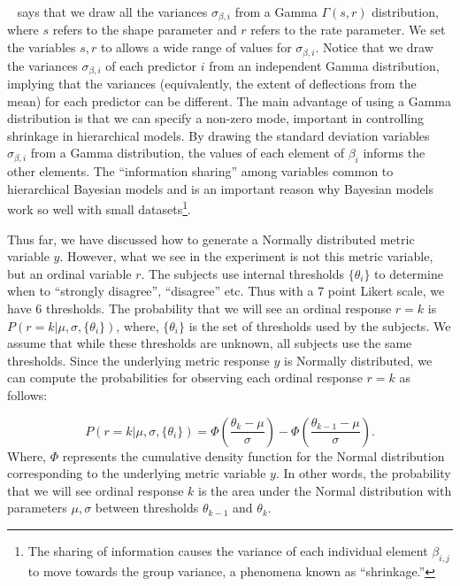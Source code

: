 ~ says that we draw all the variances $\sigma_{\beta, i}$ from a Gamma $\Gamma(s,r)$ distribution, where $s$ refers to the shape parameter and $r$ refers to the rate parameter. We set the variables $s,r$ to allows a wide range of values for $\sigma_{\beta, i}$. Notice that we draw the variances $\sigma_{\beta, i}$ of each predictor $i$ from an independent Gamma distribution, implying that the variances (equivalently, the extent of deflections from the mean) for each predictor can be different. The main advantage of using a Gamma distribution is that we can specify a non-zero mode, important in controlling shrinkage in hierarchical models. By drawing the standard deviation variables $\sigma_{\beta, i}$ from a Gamma distribution, the values of each element of $\beta_i$ informs the other elements. The ``information sharing'' among variables common to hierarchical Bayesian models and is an important reason why Bayesian models work so well with small datasets\footnote{The sharing of information causes the variance of each individual element $\beta_{i,j}$ to move towards the group variance, a phenomena known as ``shrinkage.'' }.




Thus far, we have discussed how to generate a Normally distributed metric variable $y$. However, what we see in the experiment is not this metric variable, but an ordinal variable $r$. The subjects use internal thresholds $\{\theta_i\}$ to determine when to ``strongly disagree'', ``disagree'' etc. Thus with a 7 point Likert scale, we have 6 thresholds. The probability that we will see an ordinal response $r=k$ is $P(r=k | \mu, \sigma, \{\theta_i\})$, where, $\{\theta_i\}$ is the set of thresholds used by the subjects. We assume that while these thresholds are unknown, all subjects use the same thresholds. Since the underlying metric response $y$ is Normally distributed, we can compute the probabilities for observing each ordinal response $r=k$ as follows:

\begin{equation}
 P(r=k | \mu, \sigma, \{\theta_i\}) = \Phi \left (\frac{\theta_k - \mu}{\sigma} \right) - \Phi \left(\frac{\theta_{k-1} - \mu}{\sigma} \right).
\end{equation}
Where, $\Phi$ represents the cumulative density function for the Normal distribution corresponding to the underlying metric variable $y$. In other words, the probability that we will see ordinal response $k$ is the area under the Normal distribution with parameters $\mu, \sigma$ between thresholds $\theta_{k-1}$ and $\theta_k$.

